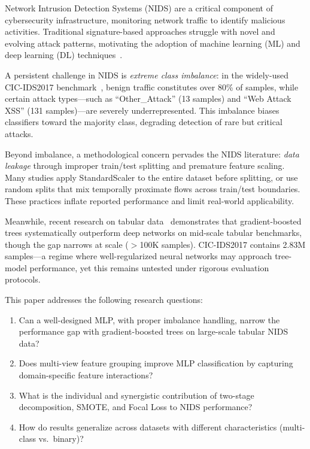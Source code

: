 \documentclass[12pt]{article}
\begin{document}

Network Intrusion Detection Systems (NIDS) are a critical component of cybersecurity infrastructure, monitoring network traffic to identify malicious activities. Traditional signature-based approaches struggle with novel and evolving attack patterns, motivating the adoption of machine learning (ML) and deep learning (DL) techniques~\cite{vinayakumar2019deep}.

A persistent challenge in NIDS is \emph{extreme class imbalance}: in the widely-used CIC-IDS2017 benchmark~\cite{sharafaldin2018toward}, benign traffic constitutes over 80\% of samples, while certain attack types---such as ``Other\_Attack'' (13 samples) and ``Web Attack XSS'' (131 samples)---are severely underrepresented. This imbalance biases classifiers toward the majority class, degrading detection of rare but critical attacks.

Beyond imbalance, a methodological concern pervades the NIDS literature: \emph{data leakage} through improper train/test splitting and premature feature scaling. Many studies apply StandardScaler to the entire dataset before splitting, or use random splits that mix temporally proximate flows across train/test boundaries. These practices inflate reported performance and limit real-world applicability.

Meanwhile, recent research on tabular data~\cite{grinsztajn2022why} demonstrates that gradient-boosted trees systematically outperform deep networks on mid-scale tabular benchmarks, though the gap narrows at scale ($>$100K samples). CIC-IDS2017 contains 2.83M samples---a regime where well-regularized neural networks may approach tree-model performance, yet this remains untested under rigorous evaluation protocols.

This paper addresses the following research questions:
\begin{enumerate}
    \item[\textbf{RQ1}] Can a well-designed MLP, with proper imbalance handling, narrow the performance gap with gradient-boosted trees on large-scale tabular NIDS data?
    \item[\textbf{RQ2}] Does multi-view feature grouping improve MLP classification by capturing domain-specific feature interactions?
    \item[\textbf{RQ3}] What is the individual and synergistic contribution of two-stage decomposition, SMOTE, and Focal Loss to NIDS performance?
    \item[\textbf{RQ4}] How do results generalize across datasets with different characteristics (multi-class vs.\ binary)?
\end{enumerate}
\end{document}
